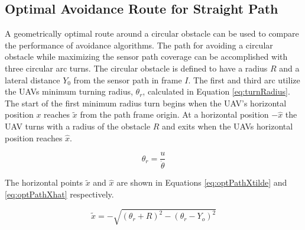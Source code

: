 \documentclass[conf]{new-aiaa}
\begin{document}
%
%


\subsection{Optimal Avoidance Route for Straight Path}
A geometrically optimal route around a circular obstacle can be used to compare the performance of avoidance algorithms. The path for avoiding a circular obstacle while maximizing the sensor path coverage can be accomplished with three circular arc turns. The circular obstacle is defined to have a radius $R$ and a lateral distance $Y_0$ from the sensor path in frame $I$. The first and third arc utilize the UAVs minimum turning radius, $\theta_r$, calculated in Equation \ref{eq:turnRadius}. The start of the first minimum radius turn begins when the UAV's horizontal position $x$ reaches  $\tilde{x}$ from the path frame origin. At a horizontal position $-\hat{x}$ the UAV turns with a radius of the obstacle $R$ and exits when the UAVs horizontal position reaches $\hat{x}$. 

\begin{equation}
\label{eq:turnRadius}
\theta_r = \frac{u}{\dot{\theta}}
\end{equation}

The horizontal points $\tilde{x}$ and $\hat{x}$ are shown in Equations \ref{eq:optPathXtilde} and \ref{eq:optPathXhat} respectively. 

\begin{equation}
\label{eq:optPathXtilde}
\widetilde{x} = -\sqrt{(\theta_r+R)^2 - (\theta_r-Y_o)^2}
\end{equation}
\end{document}
